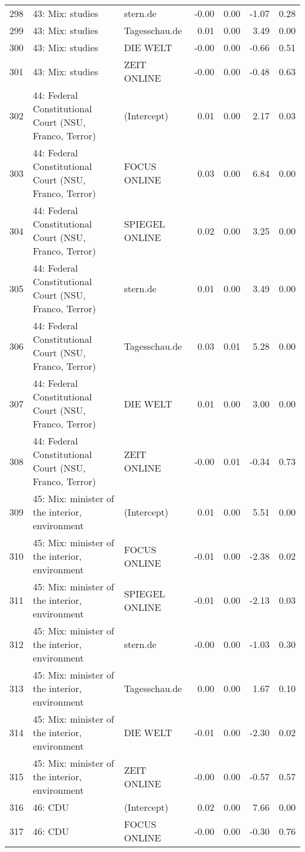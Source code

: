 \begin{table}[ht]
{\begin{tabular}{rllrrrr}
  298 & 43: Mix: studies & stern.de & -0.00 & 0.00 & -1.07 & 0.28 \\ 
  299 & 43: Mix: studies & Tagesschau.de & 0.01 & 0.00 & 3.49 & 0.00 \\ 
  300 & 43: Mix: studies & DIE WELT & -0.00 & 0.00 & -0.66 & 0.51 \\ 
  301 & 43: Mix: studies & ZEIT ONLINE & -0.00 & 0.00 & -0.48 & 0.63 \\ 
  302 & 44: Federal Constitutional Court (NSU, Franco, Terror) & (Intercept) & 0.01 & 0.00 & 2.17 & 0.03 \\ 
  303 & 44: Federal Constitutional Court (NSU, Franco, Terror) & FOCUS ONLINE & 0.03 & 0.00 & 6.84 & 0.00 \\ 
  304 & 44: Federal Constitutional Court (NSU, Franco, Terror) & SPIEGEL ONLINE & 0.02 & 0.00 & 3.25 & 0.00 \\ 
  305 & 44: Federal Constitutional Court (NSU, Franco, Terror) & stern.de & 0.01 & 0.00 & 3.49 & 0.00 \\ 
  306 & 44: Federal Constitutional Court (NSU, Franco, Terror) & Tagesschau.de & 0.03 & 0.01 & 5.28 & 0.00 \\ 
  307 & 44: Federal Constitutional Court (NSU, Franco, Terror) & DIE WELT & 0.01 & 0.00 & 3.00 & 0.00 \\ 
  308 & 44: Federal Constitutional Court (NSU, Franco, Terror) & ZEIT ONLINE & -0.00 & 0.01 & -0.34 & 0.73 \\ 
  309 & 45: Mix: minister of the interior, environment & (Intercept) & 0.01 & 0.00 & 5.51 & 0.00 \\ 
  310 & 45: Mix: minister of the interior, environment & FOCUS ONLINE & -0.01 & 0.00 & -2.38 & 0.02 \\ 
  311 & 45: Mix: minister of the interior, environment & SPIEGEL ONLINE & -0.01 & 0.00 & -2.13 & 0.03 \\ 
  312 & 45: Mix: minister of the interior, environment & stern.de & -0.00 & 0.00 & -1.03 & 0.30 \\ 
  313 & 45: Mix: minister of the interior, environment & Tagesschau.de & 0.00 & 0.00 & 1.67 & 0.10 \\ 
  314 & 45: Mix: minister of the interior, environment & DIE WELT & -0.01 & 0.00 & -2.30 & 0.02 \\ 
  315 & 45: Mix: minister of the interior, environment & ZEIT ONLINE & -0.00 & 0.00 & -0.57 & 0.57 \\ 
  316 & 46: CDU & (Intercept) & 0.02 & 0.00 & 7.66 & 0.00 \\ 
  317 & 46: CDU & FOCUS ONLINE & -0.00 & 0.00 & -0.30 & 0.76 \\ 

\end{tabular}}
\end{table}
